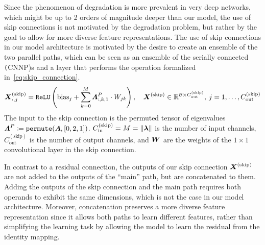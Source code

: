 Since the phenomenon of degradation is more prevalent in very deep networks, which might be up to 2 orders of magnitude deeper
than our model, the use of skip connections is not motivated by the degradation problem, but rather by the goal to allow
for more diverse feature representations.
The use of skip connections in our model architecture is motivated by the
desire to create an ensemble of the two parallel paths, which can be seen as an ensemble of the serially connected
\texttt(CNNP)s and a layer that performs the operation formalized in~\autoref{eq:skip_connection}.
\begin{equation}
    \boldsymbol{X}_{:, j}^{\text{(skip)}} = \texttt{ReLU}\left(\text{bias}_j + \sum_{k=0}^{M} \boldsymbol{\varLambda}_{:, k, 1}^P \cdot W_{jk}\right), \quad  \boldsymbol{X}^{\text{(skip)}} \in \mathbb{R}^{\mathcal{B} \times C_{\text{out}}^{(\text{skip})}}, \: j = 1, \ldots, C_{\text{out}}^{(\text{skip})}
    \label{eq:skip_connection}
\end{equation}
The input to the skip connection is the permuted tensor of eigenvalues \( \boldsymbol{\varLambda}^P \coloneqq \texttt{permute}( \boldsymbol{\varLambda}, [0, 2, 1] ) \).
\( C_{\text{in}}^{(\text{skip})} = M = \| \boldsymbol{\lambda} \| \) is the number of input channels, \( C_{\text{out}}^{(\text{skip})} \)
is the number of output channels, and \( \boldsymbol{W} \) are the weights of the \( 1 \times 1 \) convolutional layer in the
skip connection.

In contrast to a residual connection, the outputs of our skip connection \( \boldsymbol{X}^{\text{(skip)}} \) are not
added to the outputs of the ``main'' path, but are concatenated to them. \\
Adding the outputs of the skip connection and the main path requires both operands to exhibit the same dimensions, which is
not the case in our model architecture. Moreover, concatenation preserves a more diverse feature representation since
it allows both paths to learn different features, rather than simplifying the learning task by allowing the model to
learn the residual from the identity mapping. \\

